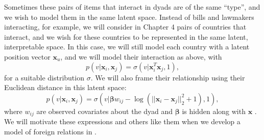 Sometimes these pairs of items that interact in dyads are of the same
``type'', and we wish to model them in the same latent space.  Instead
of bills and lawmakers interacting, for example, we will consider in Chapter 4
pairs of countries that interact, and we wish for these countries to
be represented in the same latent, interpretable space.  In this case,
we will still model each country with a latent position vector $\bm
x_u$, and we will model their interaction as above, with
\[
  p(v | \bm x_i, \bm x_j) = \sigma(v | \bm x_i^T \bm x_j, 1),
\]
for a suitable distribution $\sigma$.  We will also frame their
relationship using their Euclidean distance
in this latent space:
\[
  p(v | \bm x_i, \bm x_j) = \sigma(v | \bm \beta w_{ij} - \log(|| \bm x_i
  - \bm x_j ||_2^2 + 1), 1),
\]
where $w_{ij}$ are observed covariates about the dyad and $\bm \beta$
is hidden along with $\bm x$ \citep{hoff:2002}. We will motivate these
expressions and others like them when we develop a model of
foreign relations in .



